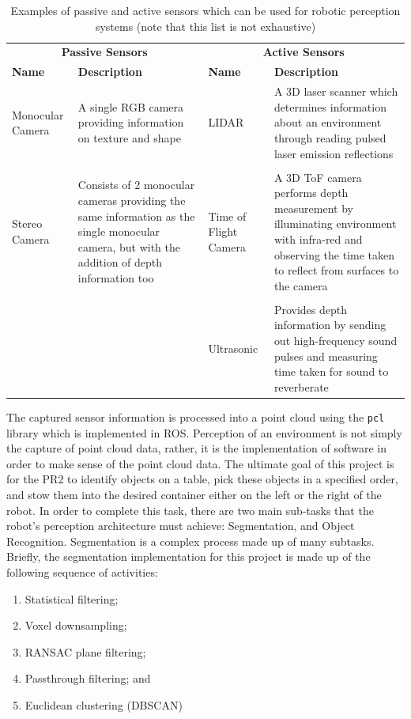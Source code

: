 \documentclass[a4paper]{article}
\begin{document}
\begin{table}[h]
\centering
\caption{Examples of passive and active sensors which can be used for robotic perception systems (note that this list is not exhaustive)}
\begin{tabular}{p{2.3cm}p{4.5cm}p{2.3cm}p{4.5cm}}
\toprule
\multicolumn{2}{c}{\textbf{Passive Sensors}} & \multicolumn{2}{c}{\textbf{Active Sensors}}\\
\cmidrule(lr){1-2} \cmidrule(lr){3-4}
\textbf{Name} & \textbf{Description} & \textbf{Name} & \textbf{Description}\\
\midrule
Monocular Camera & A single RGB camera providing information on texture and shape & LIDAR & A 3D laser scanner which determines information about an environment through reading pulsed laser emission reflections\\
& & & \\
Stereo Camera & Consists of 2 monocular cameras providing the same information as the single monocular camera, but with the addition of depth information too & Time of Flight Camera & A 3D ToF camera performs depth measurement by illuminating environment with infra-red and observing the time taken to reflect from surfaces to the camera\\
& & & \\
& & Ultrasonic & Provides depth information by sending out high-frequency sound pulses and measuring time taken for sound to reverberate\\
\bottomrule
\end{tabular}
\end{table}

The captured sensor information is processed into a point cloud using the \verb|pcl| library which is implemented in ROS. Perception of an environment is not simply the capture of point cloud data, rather, it is the implementation of software in order to make sense of the point cloud data. The ultimate goal of this project is for the PR2 to identify objects on a table, pick these objects in a specified order, and stow them into the desired container either on the left or the right of the robot. In order to complete this task, there are two main sub-tasks that the robot's perception architecture must achieve: Segmentation, and Object Recognition. Segmentation is a complex process made up of many subtasks. Briefly, the segmentation implementation for this project is made up of the following sequence of activities:
\begin{enumerate}
\item Statistical filtering;
\item Voxel downsampling;
\item RANSAC plane filtering;
\item Passthrough filtering; and
\item Euclidean clustering (DBSCAN)
\end{enumerate}
\end{document}
